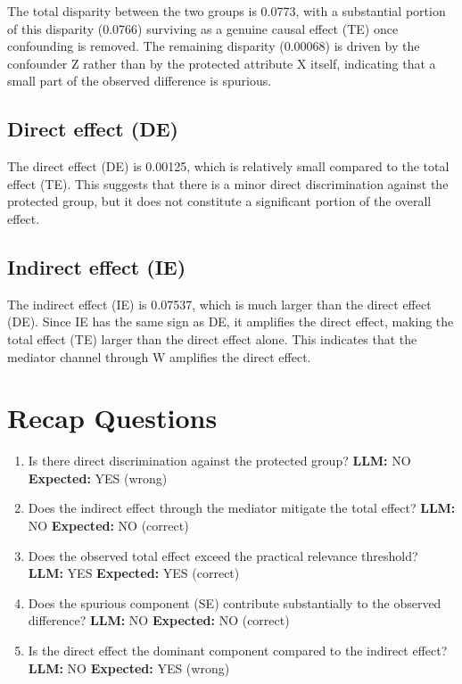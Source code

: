 \documentclass[11pt]{article}
\begin{document}
The total disparity between the two groups is 0.0773, with a substantial portion of this disparity (0.0766) surviving as a genuine causal effect (TE) once confounding is removed. The remaining disparity (0.00068) is driven by the confounder Z rather than by the protected attribute X itself, indicating that a small part of the observed difference is spurious.

\subsection{Direct effect (DE)}

The direct effect (DE) is 0.00125, which is relatively small compared to the total effect (TE). This suggests that there is a minor direct discrimination against the protected group, but it does not constitute a significant portion of the overall effect.

\subsection{Indirect effect (IE)}

The indirect effect (IE) is 0.07537, which is much larger than the direct effect (DE). Since IE has the same sign as DE, it amplifies the direct effect, making the total effect (TE) larger than the direct effect alone. This indicates that the mediator channel through W amplifies the direct effect.

\section{Recap Questions}

\begin{enumerate}
\item Is there direct discrimination against the protected group? \textbf{LLM:} NO \quad \textbf{Expected:} YES \quad (wrong)
\item Does the indirect effect through the mediator mitigate the total effect? \textbf{LLM:} NO \quad \textbf{Expected:} NO \quad (correct)
\item Does the observed total effect exceed the practical relevance threshold? \textbf{LLM:} YES \quad \textbf{Expected:} YES \quad (correct)
\item Does the spurious component (SE) contribute substantially to the observed difference? \textbf{LLM:} NO \quad \textbf{Expected:} NO \quad (correct)
\item Is the direct effect the dominant component compared to the indirect effect? \textbf{LLM:} NO \quad \textbf{Expected:} YES \quad (wrong)
\end{enumerate}
\end{document}
